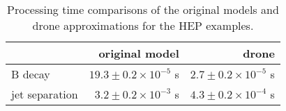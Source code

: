 \begin{table}[t]
  \centering
  \caption{Processing time comparisons of the original models and drone
  approximations for the HEP examples. \label{tab:comp}}
  \begin{tabular}{l|rr}
                   & original model                  & drone \\
    \hline
    B decay        & $19.3 \pm 0.2 \times 10^{-5}$ s & $2.7 \pm 0.2 \times 10^{-5}$ s \\
    jet separation &  $3.2 \pm 0.2 \times 10^{-3}$ s & $4.3 \pm 0.2 \times 10^{-4}$ s \\
  \end{tabular}
\end{table}
